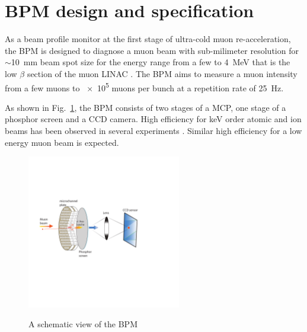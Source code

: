 \documentclass[preprint,3p,twocolumn]{elsarticle}
\begin{document}
\section{BPM design and specification}

As a beam profile monitor at the first stage of ultra-cold muon re-acceleration, the BPM is designed to diagnose a muon beam with %
sub-milimeter resolution for $\sim$\SI{10}{\mm} beam spot size for the energy range from a few to \SI{4}{\MeV} that is the low $\beta$ section of the muon LINAC \cite{IH}.
The BPM aims to measure a muon intensity from a few muons to \num{e5} muons per bunch at a repetition rate of \SI{25}{\hertz}. %

As shown in Fig.~\ref{fig:BPM_scheme}, the BPM consists of two stages of a MCP, one stage of a phosphor screen and a CCD camera.
High efficiency for \si{\keV} order atomic and ion beams has been observed in several experiments \cite{MCP_efficiency, MCP_efficiency1}. Similar high efficiency for a low energy muon beam is expected. 
\begin{figure}
\begin{center}
\vspace{-2.5cm}
\includegraphics[width=0.6\textwidth, height=0.6\textwidth]{figure/bpm_v3.pdf}
\vspace{-3cm}
\caption{A schematic view of the BPM
}
\vspace{-0.5cm}
\label{fig:BPM_scheme}
\end{center} \end{figure}
\end{document}
